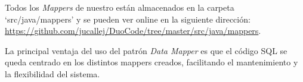 Todos los \textit{Mappers} de nuestro están almacenados en la carpeta `src/java/mappers' y se pueden ver online en la siguiente dirección: \url{https://github.com/jucallej/DuoCode/tree/master/src/java/mappers}.

La principal ventaja del uso del patrón \textit{Data Mapper} es que el código SQL se queda centrado en los distintos mappers creados, facilitando el mantenimiento y la flexibilidad del sistema.